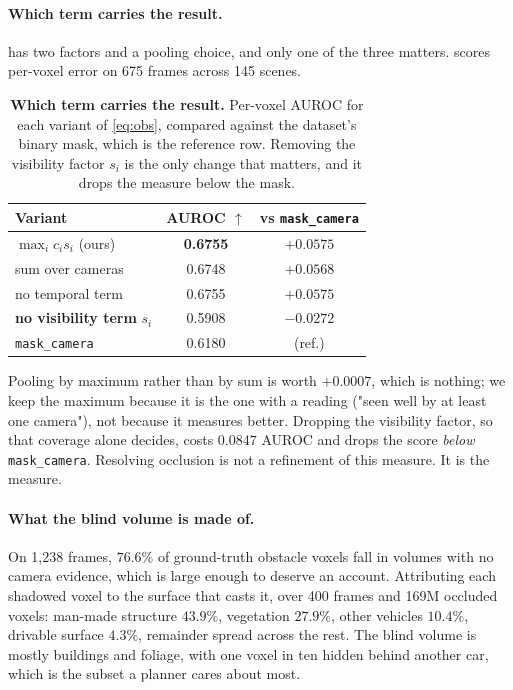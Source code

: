\documentclass[10pt,twocolumn,letterpaper]{article}
\begin{document}
\paragraph{Which term carries the result.}  has two factors and
a pooling choice, and only one of the three matters. 
scores per-voxel error on 675 frames across 145 scenes.

\begin{table}[t]
\centering\small
\begin{tabular}{lcc}
\toprule
Variant & AUROC $\uparrow$ & vs \texttt{mask\_camera} \\
\midrule
$\max_i c_i s_i$ \;(ours)        & \textbf{0.6755} & $+0.0575$ \\
sum over cameras                 & 0.6748 & $+0.0568$ \\
no temporal term                 & 0.6755 & $+0.0575$ \\
\textbf{no visibility term} $s_i$ & 0.5908 & $\mathbf{-0.0272}$ \\
\texttt{mask\_camera}            & 0.6180 & (ref.) \\
\bottomrule
\end{tabular}
\caption{\textbf{Which term carries the result.} Per-voxel AUROC for each
variant of \cref{eq:obs}, compared against the dataset's binary mask, which
is the reference row. Removing the visibility factor $s_i$ is the only
change that matters, and it drops the measure below the mask.}
\label{tab:variants}
\end{table}
Pooling by maximum rather than by sum is worth $+0.0007$, which is nothing;
we keep the maximum because it is the one with a reading ("seen well by at
least one camera"), not because it measures better. Dropping the visibility
factor, so that coverage alone decides, costs $0.0847$ AUROC and drops the
score \emph{below} \texttt{mask\_camera}. Resolving occlusion is not a
refinement of this measure. It is the measure.

\paragraph{What the blind volume is made of.} On 1{,}238 frames, $76.6\%$
of ground-truth obstacle voxels fall in volumes with no camera evidence,
which is large enough to deserve an account. Attributing each shadowed
voxel to the surface that casts it, over 400 frames and 169M occluded
voxels: man-made structure $43.9\%$, vegetation $27.9\%$, other vehicles
$10.4\%$, drivable surface $4.3\%$, remainder spread across the rest. The
blind volume is mostly buildings and foliage, with one voxel in ten hidden
behind another car, which is the subset a planner cares about most.
\end{document}

